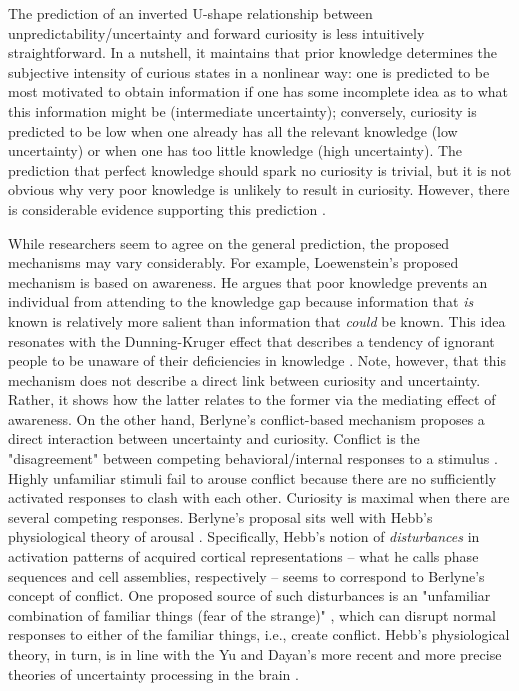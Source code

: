 The prediction of an inverted U-shape relationship between unpredictability/uncertainty and forward curiosity is less intuitively straightforward. In a nutshell, it maintains that prior knowledge determines the subjective intensity of curious states in a nonlinear way: one is predicted to be most motivated to obtain information if one has some incomplete idea as to what this information might be (intermediate uncertainty); conversely, curiosity is predicted to be low when one already has all the relevant knowledge (low uncertainty) or when one has too little knowledge (high uncertainty). The prediction that perfect knowledge should spark no curiosity is trivial, but it is not obvious why very poor knowledge is unlikely to result in curiosity. However, there is considerable evidence supporting this prediction \parencite{berlyne_experimental_1954,day_prior_1972,loewenstein_psychology_1994,kang_wick_2009,baranes_eye_2015}.

While researchers seem to agree on the general prediction, the proposed mechanisms may vary considerably. For example, Loewenstein's \parencite{loewenstein_psychology_1994} proposed mechanism is based on awareness. He argues that poor knowledge prevents an individual from attending to the knowledge gap because information that \emph{is} known is relatively more salient than information that \emph{could} be known. This idea resonates with the Dunning-Kruger effect that describes a tendency of ignorant people to be unaware of their deficiencies in knowledge \parencite{dunning_chapter_2011}. Note, however, that this mechanism does not describe a direct link between curiosity and uncertainty. Rather, it shows how the latter relates to the former via the mediating effect of awareness. On the other hand, Berlyne's \parencite{berlyne_theory_1954} conflict-based mechanism proposes a direct interaction between uncertainty and curiosity. Conflict is the "disagreement" between competing behavioral/internal responses to a stimulus \parencite{berlyne_theory_1954,berlyne_uncertainty_1957}. Highly unfamiliar stimuli fail to arouse conflict because there are no sufficiently activated responses to clash with each other. Curiosity is maximal when there are several competing responses. Berlyne's proposal sits well with Hebb's physiological theory of arousal \parencite{hebb_drives_1955}. Specifically, Hebb's notion of \emph{disturbances} in activation patterns of acquired cortical representations -- what he calls phase sequences and cell assemblies, respectively \parencite{hebb_organization_2002} -- seems to correspond to Berlyne's concept of conflict. One proposed source of such disturbances is an "unfamiliar combination of familiar things (fear of the strange)" \parencite[][, p. 250]{hebb_organization_2002}, which can disrupt normal responses to either of the familiar things, i.e., create conflict. Hebb's physiological theory, in turn, is in line with the Yu and Dayan's more recent and more precise theories of uncertainty processing in the brain \parencite{yu_expected_2003,yu_uncertainty_2005}.


